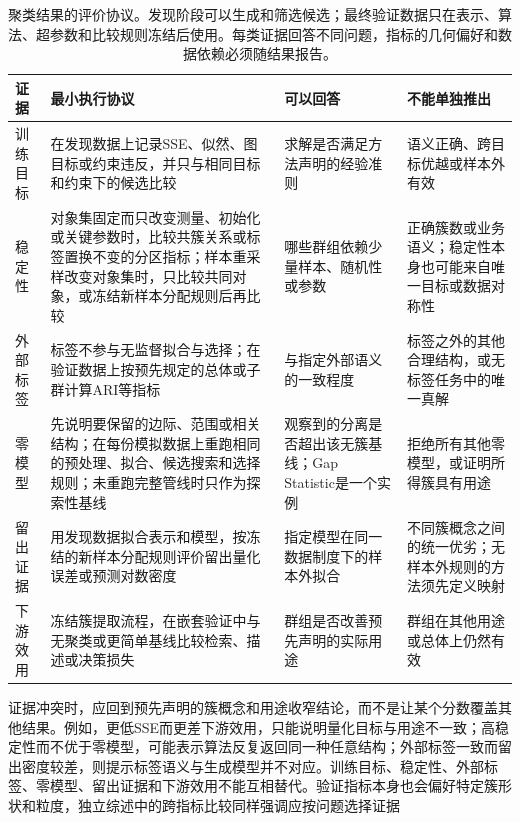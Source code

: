 \begin{table}[htbp]
  \centering
  \small
  \begin{tabularx}{\linewidth}{@{}>{\RaggedRight\arraybackslash}p{21mm}>{\RaggedRight\arraybackslash}p{43mm}XX@{}}
    \toprule
    证据 & 最小执行协议 & 可以回答 & 不能单独推出 \\
    \midrule
    训练目标 & 在发现数据上记录SSE、似然、图目标或约束违反，并只与相同目标和约束下的候选比较 & 求解是否满足方法声明的经验准则 & 语义正确、跨目标优越或样本外有效 \\
    稳定性 & 对象集固定而只改变测量、初始化或关键参数时，比较共簇关系或标签置换不变的分区指标；样本重采样改变对象集时，只比较共同对象，或冻结新样本分配规则后再比较 & 哪些群组依赖少量样本、随机性或参数 & 正确簇数或业务语义；稳定性本身也可能来自唯一目标或数据对称性 \\
    外部标签 & 标签不参与无监督拟合与选择；在验证数据上按预先规定的总体或子群计算ARI等指标 & 与指定外部语义的一致程度 & 标签之外的其他合理结构，或无标签任务中的唯一真解 \\
    零模型 & 先说明要保留的边际、范围或相关结构；在每份模拟数据上重跑相同的预处理、拟合、候选搜索和选择规则；未重跑完整管线时只作为探索性基线 & 观察到的分离是否超出该无簇基线；Gap Statistic是一个实例 & 拒绝所有其他零模型，或证明所得簇具有用途 \\
    留出证据 & 用发现数据拟合表示和模型，按冻结的新样本分配规则评价留出量化误差或预测对数密度 & 指定模型在同一数据制度下的样本外拟合 & 不同簇概念之间的统一优劣；无样本外规则的方法须先定义映射 \\
    下游效用 & 冻结簇提取流程，在嵌套验证中与无聚类或更简单基线比较检索、描述或决策损失 & 群组是否改善预先声明的实际用途 & 群组在其他用途或总体上仍然有效 \\
    \bottomrule
  \end{tabularx}
  \caption{聚类结果的评价协议。发现阶段可以生成和筛选候选；最终验证数据只在表示、算法、超参数和比较规则冻结后使用。每类证据回答不同问题，指标的几何偏好和数据依赖必须随结果报告。}
  \label{tab:clustering-evaluation-protocol}
\end{table}

证据冲突时，应回到预先声明的簇概念和用途收窄结论，而不是让某个分数覆盖其他结果。例如，更低SSE而更差下游效用，只能说明量化目标与用途不一致；高稳定性而不优于零模型，可能表示算法反复返回同一种任意结构；外部标签一致而留出密度较差，则提示标签语义与生成模型并不对应。训练目标、稳定性、外部标签、零模型、留出证据和下游效用不能互相替代。验证指标本身也会偏好特定簇形状和粒度，独立综述中的跨指标比较同样强调应按问题选择证据

